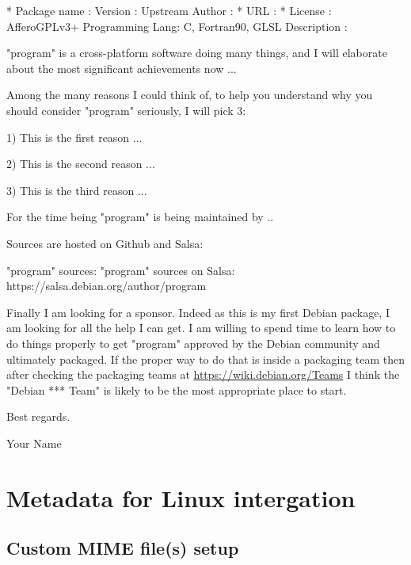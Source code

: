 {\footnotesize{
\begin{script}
 \magenta{--} 
 

* Package name    : 
  Version         : 
  Upstream Author : 
* URL             : 
* License         : AfferoGPLv3+
  Programming Lang: C, Fortran90, GLSL
  Description     : 

"program" is a cross-platform software doing many things, 
and I will elaborate about the most significant achievements now ...

Among the many reasons I could think of, to help you understand why you
should consider "program" seriously, I will pick 3: 

1) This is the first reason ...

2) This is the second reason ...

3) This is the third reason ...

For the time being "program" is being maintained by ..

Sources are hosted on Github and Salsa:

"program" sources:          \gitprog
"program" sources on Salsa: https://salsa.debian.org/author/program

Finally I am looking for a sponsor. 
Indeed as this is my first Debian package, I am looking for all the help I can get. 
I am willing to spend time to learn how to do things properly 
to get "program" approved by the Debian community and ultimately packaged. 
If the proper way to do that is inside a packaging team then after checking 
the packaging teams at \href{https://wiki.debian.org/Teams}{https://wiki.debian.org/Teams} 
I think the "Debian *** Team" is likely to be the most appropriate place to start.

Best regards.

Your Name
\end{script}
}}

\section{Metadata for Linux intergation}

\subsection{Custom MIME file(s) setup}
\label{mime}

